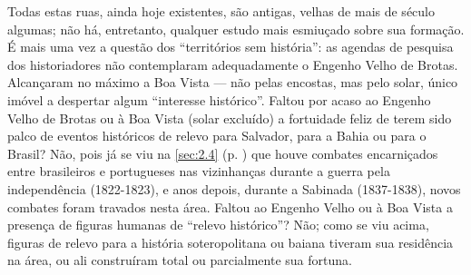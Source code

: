 Todas estas ruas, ainda hoje existentes, são antigas, velhas de mais de século algumas; não há, entretanto, qualquer estudo mais esmiuçado sobre sua formação. É mais uma vez a questão dos ``territórios sem história'': as agendas de pesquisa dos historiadores não contemplaram adequadamente o Engenho Velho de Brotas. Alcançaram no máximo a Boa Vista --- não pelas encostas, mas pelo solar, único imóvel a despertar algum ``interesse histórico''. Faltou por acaso ao Engenho Velho de Brotas ou à Boa Vista (solar excluído) a fortuidade feliz de terem sido palco de eventos históricos de relevo para Salvador, para a Bahia ou para o Brasil? Não, pois já se viu na \autoref{sec:2.4} (p. \pageref{sec:2.4}) que houve combates encarniçados entre brasileiros e portugueses nas vizinhanças durante a guerra pela independência (1822-1823), e anos depois, durante a Sabinada (1837-1838), novos combates foram travados nesta área. Faltou ao Engenho Velho ou à Boa Vista a presença de figuras humanas de ``relevo histórico''? Não; como se viu acima, figuras de relevo para a história soteropolitana ou baiana tiveram sua residência na área, ou ali construíram total ou parcialmente sua fortuna.

